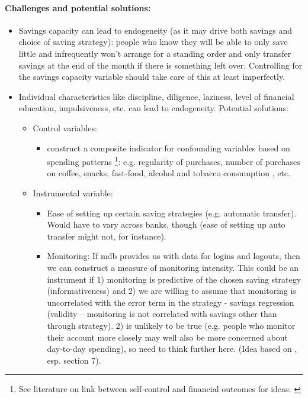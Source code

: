 \documentclass[a4paper, 11pt]{report}
\begin{document}
\paragraph{Challenges and potential solutions:}
\begin{itemize}
	\item Savings capacity can lead to endogeneity (as it may drive both savings and choice of saving strategy): people who know they will be able to only save little and infrequently won't arrange for a standing order and only transfer savings at the end of the month if there is something left over. Controlling for the savings capacity variable should take care of this at least imperfectly.

	\item Individual characteristics like discipline, diligence, laziness, level of financial education, impulsiveness, etc. can lead to endogeneity. Potential solutions:
	\begin{itemize}
		\item Control variables:
		\begin{itemize}
			\item construct a composite indicator for confounding variables based on spending patterns \footnote{See literature on link between self-control and financial outcomes for ideas: \citet{biljanovska2018control,gathergood2012self,mccarthy2011behavioural}}: e.g. regularity of purchases, number of purchases on coffee, snacks, fast-food, alcohol and tobacco consumption \citep{bertaut2009credit}, etc.
		\end{itemize}

		\item Instrumental variable:
		\begin{itemize}
			\item Ease of setting up certain saving strategies (e.g. automatic transfer). Would have to vary across banks, though (ease of setting up auto transfer might not, for instance).

			\item Monitoring: If mdb provides us with data for logins and logouts, then we can construct a measure of monitoring intensity. This could be an instrument if 1) monitoring is predictive of the chosen saving strategy (informativeness) and 2) we are willing to assume that monitoring is uncorrelated with the error term in the strategy - savings regression (validity -- monitoring is not correlated with savings other than through strategy). 2) is unlikely to be true (e.g. people who monitor their account more closely may well also be more concerned about day-to-day spending), so need to think further here. (Idea based on \citet{ameriks2003wealth}, esp. section 7).


\end{itemize}
\end{itemize}
\end{itemize}
\end{document}
